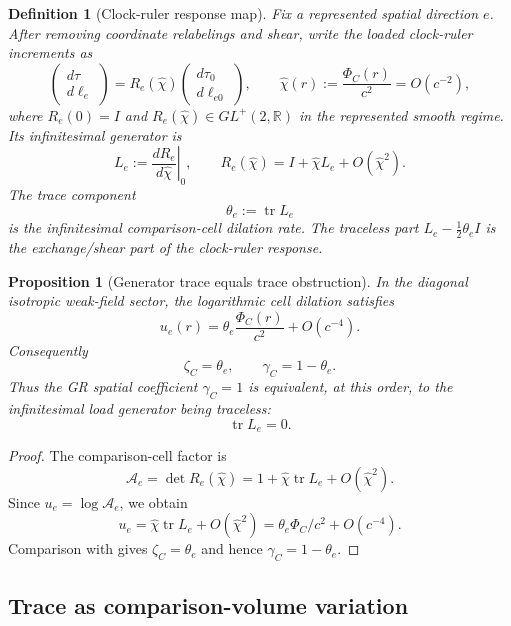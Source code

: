 \documentclass[11pt]{article}
\newtheorem{proposition}[theorem]{Proposition}
\newtheorem{definition}[theorem]{Definition}
\theoremstyle{remark}
\begin{document}
\begin{definition}[Clock-ruler response map]
\label{def:clock-ruler-response-map}
Fix a represented spatial direction \(e\).  After removing coordinate relabelings and shear, write the loaded clock-ruler increments as
\[
        \begin{pmatrix} d\tau \\ d\ell_e \end{pmatrix}
        =R_e(\hat\chi)
        \begin{pmatrix} d\tau_0 \\ d\ell_{e0} \end{pmatrix},
        \qquad
        \hat\chi(r):=\frac{\Phi_C(r)}{c^2}=O(c^{-2}),
\]
where \(R_e(0)=I\) and \(R_e(\hat\chi)\in GL^+(2,\mathbb R)\) in the represented smooth regime.  Its infinitesimal generator is
\[
        L_e:=\left.\frac{dR_e}{d\hat\chi}\right|_{0},
        \qquad
        R_e(\hat\chi)=I+\hat\chi L_e+O(\hat\chi^2).
\]
The trace component
\[
        \theta_e:=\operatorname{tr}L_e
\]
is the infinitesimal comparison-cell dilation rate.  The traceless part \(L_e-\frac12\theta_e I\) is the exchange/shear part of the clock-ruler response.
\end{definition}

\begin{proposition}[Generator trace equals trace obstruction]
\label{prop:generator-trace-obstruction}
In the diagonal isotropic weak-field sector, the logarithmic cell dilation satisfies
\[
        u_e(r)=\theta_e\frac{\Phi_C(r)}{c^2}+O(c^{-4}).
\]
Consequently
\[
        \zeta_C=\theta_e,
        \qquad
        \gamma_C=1-\theta_e.
\]
Thus the GR spatial coefficient \(\gamma_C=1\) is equivalent, at this order, to the infinitesimal load generator being traceless:
\[
        \operatorname{tr}L_e=0.
\]
\end{proposition}

\begin{proof}
The comparison-cell factor is
\[
        \mathcal A_e=\det R_e(\hat\chi)
        =1+\hat\chi\operatorname{tr}L_e+O(\hat\chi^2).
\]
Since \(u_e=\log\mathcal A_e\), we obtain
\[
        u_e=\hat\chi\operatorname{tr}L_e+O(\hat\chi^2)
        =\theta_e\Phi_C/c^2+O(c^{-4}).
\]
Comparison with  gives \(\zeta_C=\theta_e\) and hence \(\gamma_C=1-\theta_e\).
\end{proof}


\subsection{Trace as comparison-volume variation}
\label{sec:trace-volume}
\end{document}

